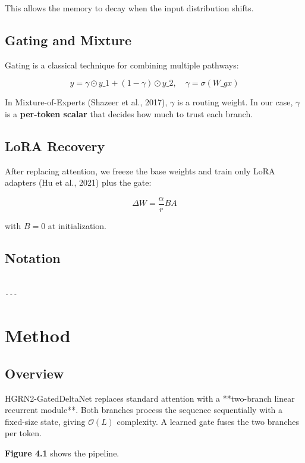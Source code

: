 This allows the memory to decay when the input distribution shifts.

\subsection{Gating and Mixture}

Gating is a classical technique for combining multiple pathways:

\[
y = \gamma \odot y\_1 + (1 - \gamma) \odot y\_2, \quad
\gamma = \sigma(W\_g x)
\tag{3.5}
\]

In Mixture-of-Experts (Shazeer et al., 2017), $\gamma$ is a routing weight. 
In our case, $\gamma$ is a \textbf{per-token scalar} that decides how much to 
trust each branch.

\subsection{LoRA Recovery}

After replacing attention, we freeze the base weights and train only LoRA 
adapters (Hu et al., 2021) plus the gate:

\[
\Delta W = \frac{\alpha}{r} B A
\tag{3.6}
\]

with $B = 0$ at initialization.

\subsection{Notation}

\begin{lstlisting}

---
\end{lstlisting}

\section{Method}

\subsection{Overview}

HGRN2-GatedDeltaNet replaces standard attention with a **two-branch linear 
recurrent module**. Both branches process the sequence sequentially with a 
fixed-size state, giving $\mathcal{O}(L)$ complexity. A learned gate fuses 
the two branches per token.

\textbf{Figure 4.1} shows the pipeline.


